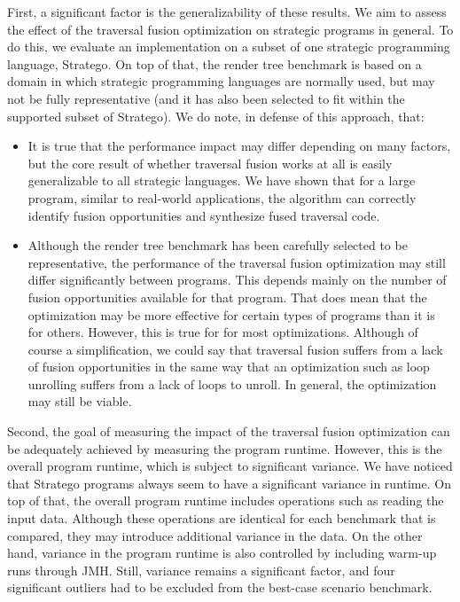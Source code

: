 First, a significant factor is the generalizability of these results. We aim to assess the effect of the traversal fusion optimization on strategic programs in general. To do this, we evaluate an implementation on a subset of one strategic programming language, Stratego. On top of that, the render tree benchmark is based on a domain in which strategic programming languages are normally used, but may not be fully representative (and it has also been selected to fit within the supported subset of Stratego). We do note, in defense of this approach, that:
\begin{itemize}
    \item It is true that the performance impact may differ depending on many factors, but the core result of whether traversal fusion works at all is easily generalizable to all strategic languages. We have shown that for a large program, similar to real-world applications, the algorithm can correctly identify fusion opportunities and synthesize fused traversal code.
    \item Although the render tree benchmark has been carefully selected to be representative, the performance of the traversal fusion optimization may still differ significantly between programs. This depends mainly on the number of fusion opportunities available for that program. That does mean that the optimization may be more effective for certain types of programs than it is for others. However, this is true for for most optimizations. Although of course a simplification, we could say that traversal fusion suffers from a lack of fusion opportunities in the same way that an optimization such as loop unrolling suffers from a lack of loops to unroll. In general, the optimization may still be viable.
\end{itemize}

Second, the goal of measuring the impact of the traversal fusion optimization can be adequately achieved by measuring the program runtime. However, this is the overall program runtime, which is subject to significant variance. We have noticed that Stratego programs always seem to have a significant variance in runtime. On top of that, the overall program runtime includes operations such as reading the input data. Although these operations are identical for each benchmark that is compared, they may introduce additional variance in the data. On the other hand, variance in the program runtime is also controlled by including warm-up runs through JMH. Still, variance remains a significant factor, and four significant outliers had to be excluded from the best-case scenario benchmark.